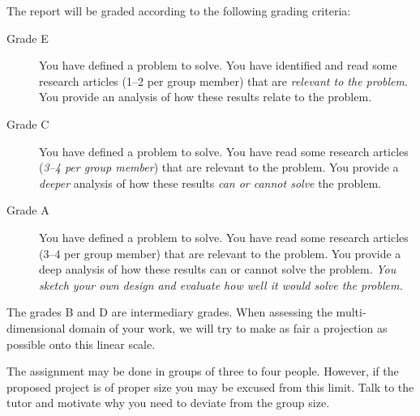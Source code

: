 The report will be graded according to the following grading criteria:
\begin{description}
  \item[Grade E]
    You have defined a problem to solve.
    You have identified and read some research articles (1--2 per group member) 
    that are \emph{relevant to the problem}.
    You provide an analysis of how these results relate to the problem.

  \item[Grade C]
    You have defined a problem to solve.
    You have read some research articles (\emph{3--4 per group member}) that 
    are relevant to the problem.
    You provide a \emph{deeper} analysis of how these results \emph{can or 
      cannot solve} the problem.

  \item[Grade A]
    You have defined a problem to solve.
    You have read some research articles (3--4 per group member) that are 
    relevant to the problem.
    You provide a deep analysis of how these results can or cannot solve the 
    problem.
    \emph{You sketch your own design and evaluate how well it would solve the 
      problem.}
\end{description}
The grades B and D are intermediary grades.
When assessing the multi-dimensional domain of your work, we will try to make 
as fair a projection as possible onto this linear scale.

The assignment may be done in groups of three to four people.
However, if the proposed project is of proper size you may be excused from this 
limit.
Talk to the tutor and motivate why you need to deviate from the group size.

\printbibliography
